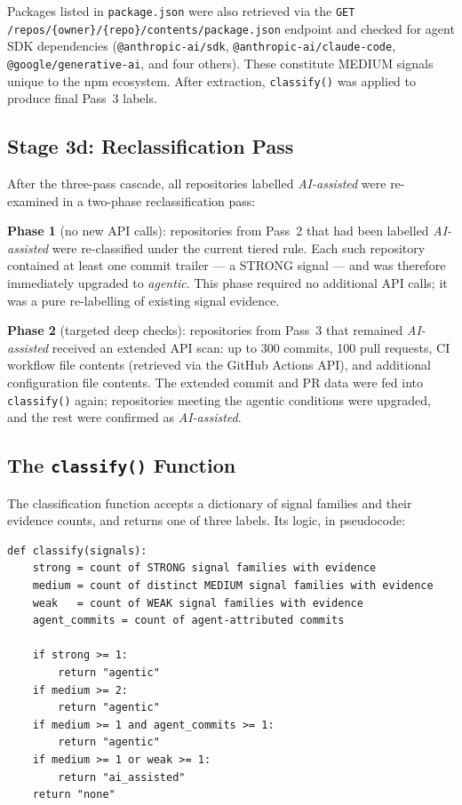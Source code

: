 Packages listed in \texttt{package.json} were also retrieved via the \texttt{GET /repos/\{owner\}/\{repo\}/contents/package.json} endpoint and checked for agent SDK dependencies (\texttt{@anthropic-ai/sdk}, \texttt{@anthropic-ai/claude-code}, \texttt{@google/generative-ai}, and four others). These constitute MEDIUM signals unique to the npm ecosystem. After extraction, \texttt{classify()} was applied to produce final Pass~3 labels.

\subsection{Stage 3d: Reclassification Pass}

After the three-pass cascade, all repositories labelled \emph{AI-assisted} were re-examined in a two-phase reclassification pass:

\textbf{Phase 1} (no new API calls): repositories from Pass~2 that had been labelled \emph{AI-assisted} were re-classified under the current tiered rule. Each such repository contained at least one commit trailer --- a STRONG signal --- and was therefore immediately upgraded to \emph{agentic}. This phase required no additional API calls; it was a pure re-labelling of existing signal evidence.

\textbf{Phase 2} (targeted deep checks): repositories from Pass~3 that remained \emph{AI-assisted} received an extended API scan: up to 300 commits, 100 pull requests, CI workflow file contents (retrieved via the GitHub Actions API), and additional configuration file contents. The extended commit and PR data were fed into \texttt{classify()} again; repositories meeting the agentic conditions were upgraded, and the rest were confirmed as \emph{AI-assisted}.

\subsection{The \texttt{classify()} Function}

The classification function accepts a dictionary of signal families and their evidence counts, and returns one of three labels. Its logic, in pseudocode:

\begin{verbatim}
def classify(signals):
    strong = count of STRONG signal families with evidence
    medium = count of distinct MEDIUM signal families with evidence
    weak   = count of WEAK signal families with evidence
    agent_commits = count of agent-attributed commits

    if strong >= 1:
        return "agentic"
    if medium >= 2:
        return "agentic"
    if medium >= 1 and agent_commits >= 1:
        return "agentic"
    if medium >= 1 or weak >= 1:
        return "ai_assisted"
    return "none"
\end{verbatim}

